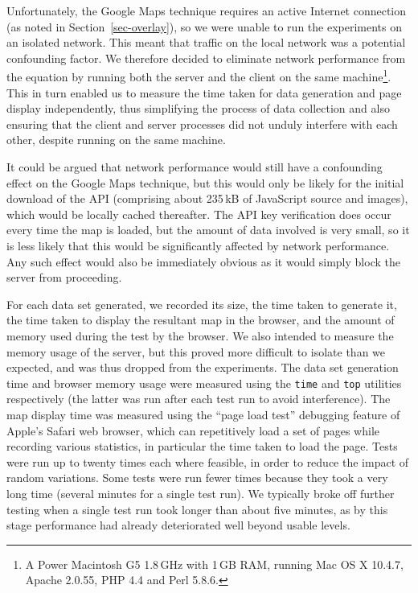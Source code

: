 \documentclass[acmtocl,acmnow]{acmtrans2m}
\begin{document}
Unfortunately, the Google Maps technique requires an active Internet
connection (as noted in Section~\ref{sec-overlay}), so we were unable to
run the experiments on an isolated network. This meant that traffic on
the local network was a potential confounding factor. We therefore
decided to eliminate network performance from the equation by running
both the server and the client on the same machine\footnote{A Power
Macintosh G5 1.8\,GHz with 1\,GB RAM, running Mac OS X 10.4.7, Apache
2.0.55, PHP 4.4 and Perl 5.8.6.}. This in turn enabled us to measure the
time taken for data generation and page display independently, thus
simplifying the process of data collection and also ensuring that the
client and server processes did not unduly interfere with each other,
despite running on the same machine.

It could be argued that network performance would still have a
confounding effect on the Google Maps technique, but this would only be
likely for the initial download of the API (comprising about 235\,kB of
JavaScript source and images), which would be locally cached thereafter.
The API key verification does occur every time the map is loaded, but
the amount of data involved is very small, so it is less likely that
this would be significantly affected by network performance. Any such
effect would also be immediately obvious as it would simply block the
server from proceeding.

For each data set generated, we recorded its size, the time taken to
generate it, the time taken to display the resultant map in the browser,
and the amount of memory used during the test by the browser. We also
intended to measure the memory usage of the server, but this proved more
difficult to isolate than we expected, and was thus dropped from the
experiments. The data set generation time and browser memory usage were
measured using the \texttt{time} and \texttt{top} utilities respectively
(the latter was run after each test run to avoid interference). The map
display time was measured using the ``page load test'' debugging feature
of Apple's Safari web browser, which can repetitively load a set of
pages while recording various statistics, in particular the time taken
to load the page. Tests were run up to twenty times each where feasible,
in order to reduce the impact of random variations. Some tests were run
fewer times because they took a very long time (several minutes for a
single test run). We typically broke off further testing when a single
test run took longer than about five minutes, as by this stage
performance had already deteriorated well beyond usable levels.
\end{document}
